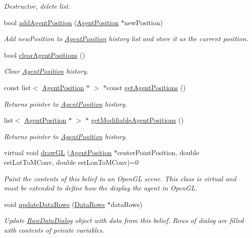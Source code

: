 \begin{DoxyCompactItemize}
\begin{DoxyCompactList}\small\item\em Destructor, delete list. \end{DoxyCompactList}\item 
bool \hyperlink{class_agent_position_belief_a03efa19776066401b75405b0f7aae6f2}{addAgentPosition} (\hyperlink{class_agent_position}{AgentPosition} $\ast$newPosition)
\begin{DoxyCompactList}\small\item\em Add newPosition to \hyperlink{class_agent_position}{AgentPosition} history list and store it as the current position. \end{DoxyCompactList}\item 
bool \hyperlink{class_agent_position_belief_aec0083de3aa4827e33429c5e03b35111}{clearAgentPositions} ()
\begin{DoxyCompactList}\small\item\em Clear \hyperlink{class_agent_position}{AgentPosition} history. \end{DoxyCompactList}\item 
const list$<$ \hyperlink{class_agent_position}{AgentPosition} $\ast$ $>$ $\ast$const \hyperlink{class_agent_position_belief_a0aaa0fc21e69548d477cc4d0cc0f1c3a}{getAgentPositions} ()
\begin{DoxyCompactList}\small\item\em Returns pointer to \hyperlink{class_agent_position}{AgentPosition} history. \end{DoxyCompactList}\item 
list$<$ \hyperlink{class_agent_position}{AgentPosition} $\ast$ $>$ $\ast$ \hyperlink{class_agent_position_belief_abb8f9d2a4497fe526a59ddf800103763}{getModifiableAgentPositions} ()
\begin{DoxyCompactList}\small\item\em Returns pointer to \hyperlink{class_agent_position}{AgentPosition} history. \end{DoxyCompactList}\item 
virtual void \hyperlink{class_agent_position_belief_a7022bf540e04f7f830af8c331a051c64}{drawGL} (\hyperlink{class_agent_position}{AgentPosition} $\ast$centerPointPosition, double estLatToMConv, double estLonToMConv)=0
\begin{DoxyCompactList}\small\item\em Paint the contents of this belief in an OpenGL scene. This class is virtual and must be extended to define how the display the agent in OpenGL. \end{DoxyCompactList}\item 
void \hyperlink{class_agent_position_belief_a881a657a0261fbbb2086365a522e7b8d}{updateDataRows} (\hyperlink{struct_data_rows}{DataRows} $\ast$dataRows)
\begin{DoxyCompactList}\small\item\em Update \hyperlink{class_raw_data_dialog}{RawDataDialog} object with data from this belief. Rows of dialog are filled with contents of private variables. \end{DoxyCompactList}\end{DoxyCompactItemize}
